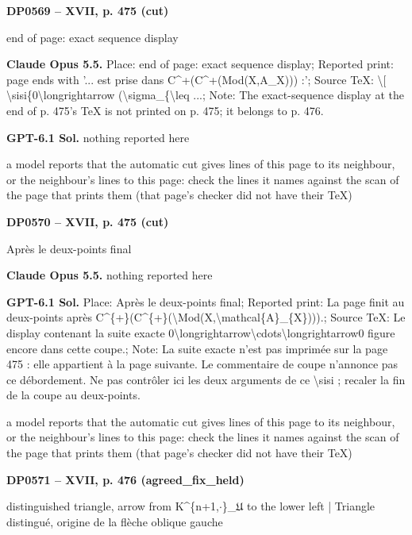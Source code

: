 \par\noindent\hypertarget{DP0569}{}\textbf{DP0569 -- XVII, p. 475 (cut)}\par
end of page: exact sequence display\par
\textbf{Claude Opus 5.5.} Place: end of page: exact sequence display; Reported print: page ends with '... est prise dans C\textasciicircum{}+(C\textasciicircum{}+(Mod(X,A\_X))) :'; Source TeX: \textbackslash{}[ \textbackslash{}sisi\{0\textbackslash{}longrightarrow (\textbackslash{}sigma\_\{\textbackslash{}leq ...; Note: The exact-sequence display at the end of p. 475's TeX is not printed on p. 475; it belongs to p. 476.\par
\textbf{GPT-6.1 Sol.} nothing reported here\par
a model reports that the automatic cut gives lines of this page to its neighbour, or the neighbour's lines to this page: check the lines it names against the scan of the page that prints them (that page's checker did not have their TeX)\par
\par\noindent\hypertarget{DP0570}{}\textbf{DP0570 -- XVII, p. 475 (cut)}\par
Après le deux-points final\par
\textbf{Claude Opus 5.5.} nothing reported here\par
\textbf{GPT-6.1 Sol.} Place: Après le deux-points final; Reported print: La page finit au deux-points après C\textasciicircum{}\{+\}(C\textasciicircum{}\{+\}(\textbackslash{}Mod(X,\textbackslash{}mathcal\{A\}\_\{X\}))).; Source TeX: Le display contenant la suite exacte 0\textbackslash{}longrightarrow\textbackslash{}cdots\textbackslash{}longrightarrow0 figure encore dans cette coupe.; Note: La suite exacte n'est pas imprimée sur la page 475 : elle appartient à la page suivante. Le commentaire de coupe n'annonce pas ce débordement. Ne pas contrôler ici les deux arguments de ce \textbackslash{}sisi ; recaler la fin de la coupe au deux-points.\par
a model reports that the automatic cut gives lines of this page to its neighbour, or the neighbour's lines to this page: check the lines it names against the scan of the page that prints them (that page's checker did not have their TeX)\par
\par\noindent\hypertarget{DP0571}{}\textbf{DP0571 -- XVII, p. 476 (agreed\_fix\_held)}\par
distinguished triangle, arrow from K\textasciicircum{}\{n+1,\ensuremath{\cdot}\}\_\ensuremath{𝔘} to the lower left | Triangle distingué, origine de la flèche oblique gauche\par
